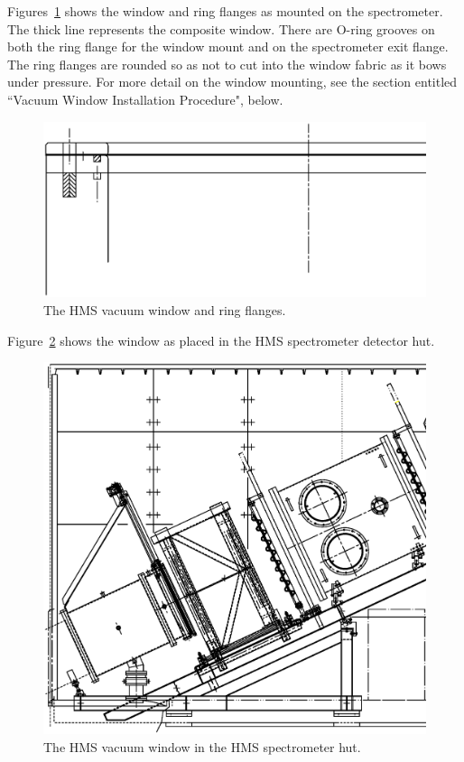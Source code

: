 Figures~\ref{fig:hms_window} shows the
window and ring flanges as mounted on the spectrometer. The thick
line represents the composite window. There are O-ring grooves on both the
ring flange for the window mount and on the spectrometer exit flange.
The ring flanges are rounded so as not to cut into the window fabric as
it bows under pressure.
For more detail on the window mounting, see
the section entitled ``Vacuum Window Installation Procedure", below.

\begin{figure}
\includegraphics[width=6in]{figHMSwindow.eps}
\caption{The HMS vacuum window and ring flanges. \label{fig:hms_window}}
\end{figure}

Figure~\ref{fig:hms_window2} shows the window as placed in the HMS spectrometer
detector hut.
\begin{figure}
\includegraphics[width=6in]{figHMShut.eps}
\caption{The HMS vacuum window in the HMS spectrometer hut. 
\label{fig:hms_window2}}
\end{figure}

